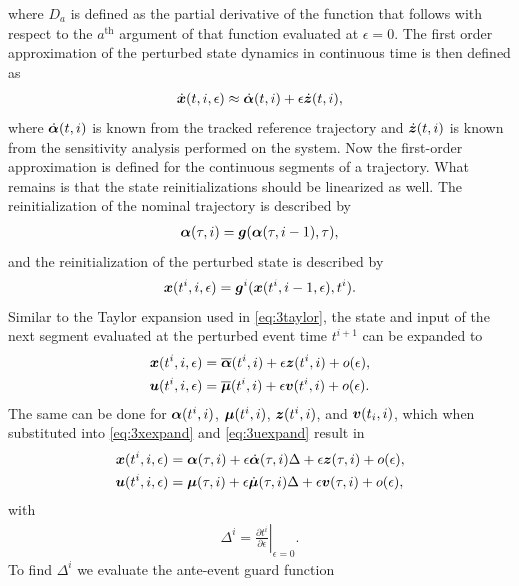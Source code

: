 \documentclass[../DC2017114Bouma.tex]{subfiles}
\begin{document}
where $D_a$ is defined as the partial derivative of the function that follows with respect to the $a^{\text{th}}$ argument of that function evaluated at $\epsilon = 0$. The first order approximation of the perturbed state dynamics in continuous time is then defined as
\begin{align}
\dot{{\boldsymbol{x}}}(t,i,\epsilon) \approx \dot{\boldsymbol{\alpha}}(t,i) + \epsilon\dot{{\boldsymbol{z}}}(t,i),
\end{align}
where $\dot{\boldsymbol{\alpha}}(t,i)$ is known from the tracked reference trajectory and $\dot{{\boldsymbol{z}}}(t,i)$ is known from the sensitivity analysis performed on the system. Now the first-order approximation is defined for the continuous segments of a trajectory. What remains is that the state reinitializations should be linearized as well. The reinitialization of the nominal trajectory is described by
\begin{align}
\boldsymbol{\alpha}(\tau,i) = {\boldsymbol{g}}(\boldsymbol{\alpha}(\tau,i-1),\tau),\label{eq:3g}
\end{align}
and the reinitialization of the perturbed state is described by
\begin{align}
{\boldsymbol{x}}(t^{i},i,\epsilon) = {\boldsymbol{g}}^i({\boldsymbol{x}}(t^{i},i-1,\epsilon),t^{i}).
\end{align}
Similar to the Taylor expansion used in \eqref{eq:3taylor}, the state and input of the next segment evaluated at the perturbed event time $t^{i+1}$ can be expanded to
\begin{align}
{\boldsymbol{x}}(t^{i},i,\epsilon) &= \overline{\boldsymbol{\alpha}}(t^{i},i) + \epsilon{\boldsymbol{z}}(t^{i},i) + o(\epsilon),\label{eq:3xexpand}\\
{\boldsymbol{u}}(t^{i},i,\epsilon) &= \overline{\boldsymbol{\mu}}(t^{i},i) + \epsilon{\boldsymbol{v}}(t^{i},i) + o(\epsilon).\label{eq:3uexpand}
\end{align}
The same can be done for $\boldsymbol{\alpha}(t^{i},i)$, $\boldsymbol{\mu}(t^{i},i)$, ${\boldsymbol{z}}(t^{i},i)$, and ${\boldsymbol{v}}(t_{i},i)$, which when substituted into \eqref{eq:3xexpand} and \eqref{eq:3uexpand} result in
\begin{align}
{\boldsymbol{x}}(t^{i},i,\epsilon) &= \boldsymbol{\alpha}(\tau,i) + \epsilon\dot{\boldsymbol{\alpha}}(\tau,i)\Delta + \epsilon{\boldsymbol{z}}(\tau,i) + o(\epsilon),\label{eq:3xexpand2}\\
{\boldsymbol{u}}(t^{i},i,\epsilon) &= \boldsymbol{\mu}(\tau,i) + \epsilon\dot{\boldsymbol{\mu}}(\tau,i)\Delta + \epsilon{\boldsymbol{v}}(\tau,i) + o(\epsilon),\label{eq:3uexpand2}
\end{align}
with
\begin{align}
\Delta^{i} = \left.\frac{\partial t^{i}}{\partial\epsilon}\right|_{\epsilon=0}.\label{eq:3Delta}
\end{align}
To find $\Delta^{i}$ we evaluate the ante-event guard function
\end{document}
